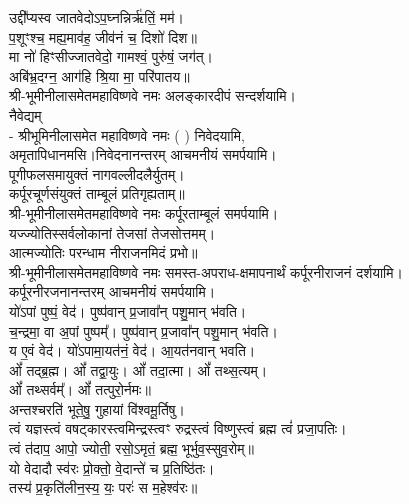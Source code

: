 उद्दी᳚प्यस्व जातवेदोऽप॒घ्नन्निर्ऋ॑तिं॒ मम॑।\\
 प॒शूꣳश्च॒ मह्य॒माव॑ह॒ जीव॑नं च॒ दिशो॑ दिश॥ \\
मा नो॑ हिꣳसीज्जातवेदो॒ गामश्वं॒ पुरु॑षं॒ जग॑त्।\\
अबि॑भ्र॒दग्न॒ आग॑हि श्रि॒या मा॒ परि॑पातय॥ \\
श्री-भूमीनीलासमेतमहाविष्णवे नमः अलङ्कारदीपं सन्दर्शयामि।\\

नैवेद्यम्\\
- श्रीभूमिनीलासमेत महाविष्णवे नमः (	) निवेदयामि, \\
अमृतापिधानमसि।निवेदनानन्तरम् आचमनीयं समर्पयामि।\\

पूगीफलसमायुक्तं नागवल्लीदलैर्युतम्।\\
कर्पूरचूर्णसंयुक्तं ताम्बूलं प्रतिगृह्यताम्॥\\
श्री-भूमीनीलासमेतमहाविष्णवे नमः कर्पूरताम्बूलं समर्पयामि।\\

यज्ज्योतिस्सर्वलोकानां तेजसां तेजसोत्तमम्।\\
आत्मज्योतिः परन्धाम नीराजनमिदं प्रभो॥\\
श्री-भूमीनीलासमेतमहाविष्णवे नमः समस्त-अपराध-क्षमापनार्थं कर्पूरनीराजनं दर्शयामि।\\
कर्पूरनीरजनानन्तरम् आचमनीयं समर्पयामि।\\

 यो॑ऽपां पुष्पं॒ वेद॑। पुष्प॑वान् प्र॒जावा᳚न् पशु॒मान् भ॑वति।\\
च॒न्द्रमा॒ वा अ॒पां पुष्पम्᳚। पुष्प॑वान् प्र॒जावा᳚न् पशु॒मान् भ॑वति।\\
य ए॒वं वेद॑। यो॑ऽपामा॒यत॑नं॒ वेद॑। आ॒यत॑नवान् भवति।\\

ओं᳚ तद्ब्र॒ह्म। ओं᳚ तद्वा॒युः। ओं᳚ तदा॒त्मा। ओं᳚ तथ्स॒त्यम्‌।\\
ओं᳚ तथ्सर्वम्᳚‌। ओं᳚ तत्पुरो॒र्नमः॥\\

अन्तश्चरति॑ भूते॒षु॒ गुहायां वि॑श्वमू॒र्तिषु। \\
त्वं यज्ञस्त्वं वषट्कारस्त्वमिन्द्रस्त्वꣳ रुद्रस्त्वं विष्णुस्त्वं ब्रह्म त्वं॑ प्रजा॒पतिः। \\
त्वं त॑दाप॒ आपो॒ ज्योती॒ रसो॒ऽमृतं॒ ब्रह्म॒ भूर्भुव॒स्सुव॒रोम्‌॥\\

यो वेदादौ स्व॑रः प्रो॒क्तो॒ वे॒दान्ते॑ च प्र॒तिष्ठि॑तः।\\
तस्य॑ प्र॒कृति॑लीन॒स्य॒ यः॒ परः॑ स म॒हेश्व॑रः॥\\

